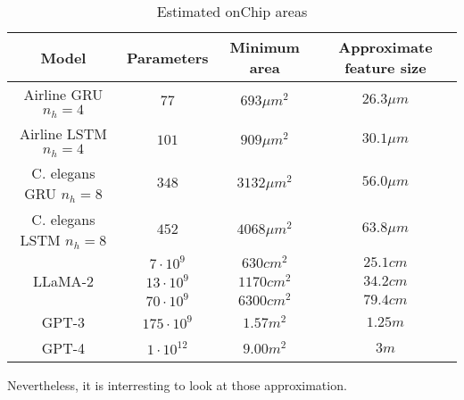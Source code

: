 \begin{table}[H]
  \centering
  \begin{tabular}{|c|c|c|c|}
    \hline
    \rowcolor{gray}
    Model & Parameters & Minimum area & Approximate feature size \\
    \hline
    Airline \ac{GRU} $n_h=4$ & $77$ & $693\mu m^2$ & $26.3\mu m$\\
    \hline
    Airline \ac{LSTM} $n_h=4$ & $101$ & $909\mu m^2$ & $30.1\mu m$\\
    \hline
    \ac{C. elegans} \ac{GRU} $n_h=8$ & $348$ & $3132\mu m^2$ & $56.0\mu m$\\
    \hline
    \ac{C. elegans} \ac{LSTM} $n_h=8$ & $452$ & $4068\mu m^2$ & $63.8\mu m$\\
    \hline
    \multirow{3}{*}{\acs{LLaMA}-2} & $7\cdot 10^9$ & $630 cm^2$ & $25.1 cm$ \\
    \cline{2-4}
    & $13\cdot 10^9$ & $1170 cm^2$ & $34.2 cm$ \\
    \cline{2-4}
    & $70\cdot 10^9$ & $6300 cm^2$ & $79.4 cm$ \\
    \hline
    \acs{GPT}-3 & $175\cdot 10^9$ & $1.57 m^2$ & $1.25m$\\
    \hline
    \acs{GPT}-4 & $1\cdot 10^{12}$ & $9.00 m^2$ & $3m$\\
    \hline
  \end{tabular}
  \caption{Estimated onChip areas}
  \label{tab:areas}
\end{table}

Nevertheless, it is interresting to look at those approximation.
